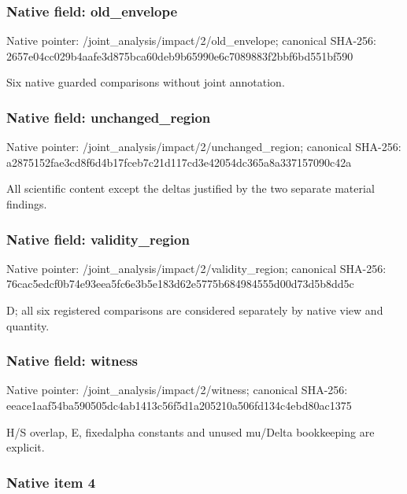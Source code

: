 \documentclass[10pt,a4paper]{article}
\begin{document}
\subsubsection{Native field: old\_envelope}


Native pointer: /joint\_analysis/impact/2/old\_envelope; canonical SHA-256: 2657e04cc029b4aafe3d875b\allowbreak{}ca60deb9b65990e6c7089883\allowbreak{}f2bbf6bd551bf590


Six native guarded comparisons without joint annotation.


\subsubsection{Native field: unchanged\_region}


Native pointer: /joint\_analysis/impact/2\allowbreak{}/unchanged\_region; canonical SHA-256: a2875152fae3cd8f6d4b17fc\allowbreak{}eb7c21d117cd3e42054dc365\allowbreak{}a8a337157090c42a


All scientific content except the deltas justified by the two separate material findings.


\subsubsection{Native field: validity\_region}


Native pointer: /joint\_analysis/impact/2\allowbreak{}/validity\_region; canonical SHA-256: 76cac5edcf0b74e93eea5fc6\allowbreak{}e3b5e183d62e5775b6849845\allowbreak{}55d00d73d5b8dd5c


D; all six registered comparisons are considered separately by native view and quantity.


\subsubsection{Native field: witness}


Native pointer: /joint\_analysis/impact/2/witness; canonical SHA-256: eeace1aaf54ba590505dc4ab\allowbreak{}1413c56f5d1a205210a506fd\allowbreak{}134c4ebd80ac1375


H/S overlap, E, fixedalpha constants and unused mu/Delta bookkeeping are explicit.


\subsubsection{Native item 4}
\end{document}
